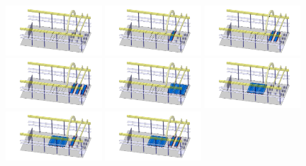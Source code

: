 \begin{figure}[!t]
\includegraphics[width=0.32\textwidth]{./Figures/assembly_sequence_11_07/0.png}
\includegraphics[width=0.32\textwidth]{./Figures/assembly_sequence_11_07/1.png}
\includegraphics[width=0.32\textwidth]{./Figures/assembly_sequence_11_07/2.png}
\includegraphics[width=0.32\textwidth]{./Figures/assembly_sequence_11_07/3.png}
\includegraphics[width=0.32\textwidth]{./Figures/assembly_sequence_11_07/4.png}
\includegraphics[width=0.32\textwidth]{./Figures/assembly_sequence_11_07/5.png}
\includegraphics[width=0.32\textwidth]{./Figures/assembly_sequence_11_07/6.png}
\includegraphics[width=0.32\textwidth]{./Figures/assembly_sequence_11_07/7.png}

\end{figure}
